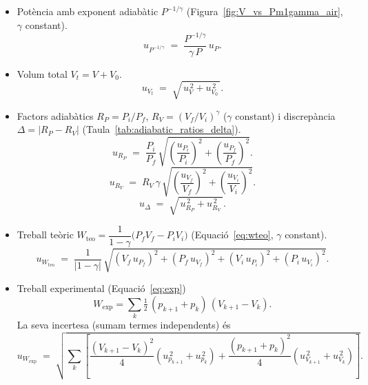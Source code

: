 \documentclass[a4paper,twoside,12pt]{article}
\theoremstyle{definition}
\begin{document}
\begin{itemize}
	\item Potència amb exponent adiabàtic \(P^{-1/\gamma}\) (Figura~\ref{fig:V_vs_Pm1gamma_air}, \(\gamma\) constant).
	\begin{equation}\label{eq:incertesa_P_inv_gamma}
		u_{P^{-1/\gamma}} \;=\; \frac{P^{-1/\gamma}}{\gamma\,P}\,u_P.
	\end{equation}
	
	\item Volum total \(V_t = V+V_0\).
	\begin{equation}\label{eq:incertesa_Vt}
		u_{V_t} \;=\; \sqrt{\,u_V^{\,2}+u_{V_0}^{\,2}\,}.
	\end{equation}
	
	\item Factors adiabàtics \(R_P=P_i/P_f\), \(R_V=(V_f/V_i)^{\gamma}\) (\(\gamma\) constant) i discrepància \(\Delta=|R_P-R_V|\) (Taula~\ref{tab:adiabatic_ratios_delta}).
	\begin{equation}\label{eq:incertesa_RP}
		u_{R_P} \;=\; \frac{P_i}{P_f}\,
		\sqrt{\left(\frac{u_{P_i}}{P_i}\right)^2+\left(\frac{u_{P_f}}{P_f}\right)^2 }.
	\end{equation}
	\begin{equation}\label{eq:incertesa_RV}
		u_{R_V} \;=\; R_V\,\gamma\,
		\sqrt{\left(\frac{u_{V_f}}{V_f}\right)^2+\left(\frac{u_{V_i}}{V_i}\right)^2 }.
	\end{equation}
	\begin{equation}\label{eq:incertesa_delta_R}
		u_\Delta \;=\; \sqrt{\,u_{R_P}^{\,2}+u_{R_V}^{\,2}\,}.
	\end{equation}
	
	\item Treball teòric \(W_{\mathrm{teo}}=\dfrac{1}{1-\gamma}\big(P_fV_f-P_iV_i\big)\) (Equació~\ref{eq:wteo}, \(\gamma\) constant).
	\begin{equation}\label{eq:incertesa_Wteo}
		u_{W_{\mathrm{teo}}} \;=\; \frac{1}{|1-\gamma|}\,
		\sqrt{(V_f\,u_{P_f})^2 + (P_f\,u_{V_f})^2 + (V_i\,u_{P_i})^2 + (P_i\,u_{V_i})^2 }.
	\end{equation}
	
	\item Treball experimental (Equació~\ref{eq:exp})
	\[
	W_{\mathrm{exp}}=\sum_{k}\tfrac{1}{2}\,(p_{k+1}+p_k)\,(V_{k+1}-V_k).
	\]
	La seva incertesa (sumam termes independents) és
	\begin{equation}\label{eq:incertesa_Wexp}
		u_{W_{\mathrm{exp}}}
		\;=\; \sqrt{\sum_{k}\left[
			\frac{(V_{k+1}-V_k)^2}{4}\left(u_{p_{k+1}}^{\,2}+u_{p_k}^{\,2}\right)
			+\frac{(p_{k+1}+p_k)^2}{4}\left(u_{V_{k+1}}^{\,2}+u_{V_k}^{\,2}\right)
			\right]}.
	\end{equation}
\end{itemize}

\newpage



	\printbibliography[
	heading=bibintoc,
	title={Bibliografia}
	]
	
\end{document}
